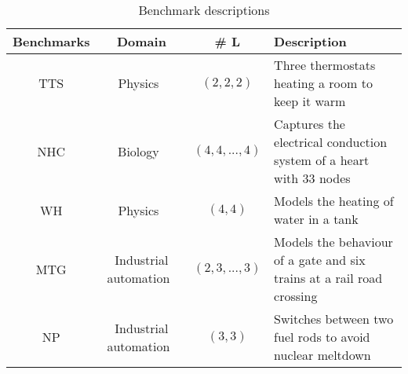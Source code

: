 \begin{table*}
	\centering
	\caption{Benchmark descriptions
	\label{tab:benchmarks}}
\begin{tabular}{ | c | c | c | l | } \hline
\textbf{Benchmarks}
	& \textbf{Domain} 
	& \textbf{\# L } 
	& \textbf{Description} \\ \hline

	\acf{TTS}
		& Physics~\cite{Pedro2005}
		& $(2, 2, 2)$
		& Three thermostats heating a room to keep it warm\\ \hline
		
	\acf{NHC}
		& Biology~\cite{chen201487}
		& $(4, 4, ..., 4)$
		& Captures the electrical conduction system of a heart with 33 nodes\\ \hline

	\acf{WH}
		& Physics~\cite{raskin05}
		& $(4, 4)$
		& Models the heating of water in a tank \\ \hline
		
	\acf{MTG}  
		& Industrial automation~\cite{Costello2013}
		& $(2, 3, ..., 3)$
		& Models the behaviour of a gate and six trains at a rail road crossing\\ \hline
		
	\acf{NP}
		& Industrial automation~\cite{alur2015book}
		& $(3, 3)$
		& Switches between two fuel rods to avoid nuclear meltdown\\ \hline
	
	
 \end{tabular}
 \end{table*}